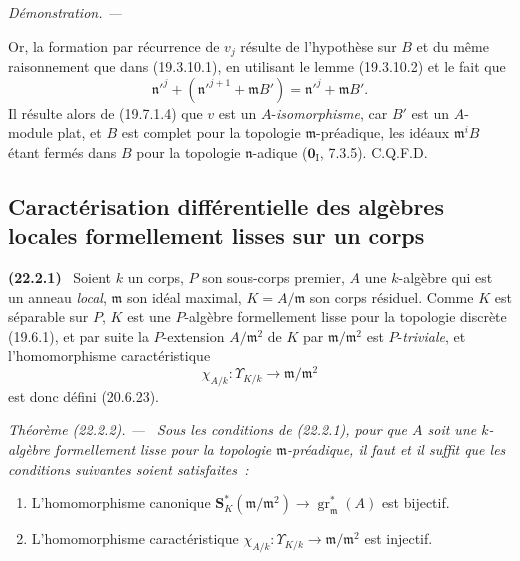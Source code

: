 \documentclass[10pt,oneside]{book}
\makeatletter
\newcommand{\setmanualcurrentlabel}[1]{\def\@currentlabel{#1}}
\newcommand{\oldpage}[2][]{%
  \setcounter{footnote}{0}%
  \marginpar{\scriptsize\textbf{#1}~|~#2}\ignorespaces}
\newenvironment{env}[1][]{\setmanualcurrentlabel{#1}\par\medskip\noindent\textbf{(#1)}\ }{\par}
\newenvironment{theorem}[1][]{%
  \setmanualcurrentlabel{#1}\par\medskip\noindent\itshape Théorème (#1). ---\ }{\par}
\newenvironment{proof}{%
  \par\medskip\noindent\textit{Démonstration. ---\ }}{\par}
\makeatother
\begin{document}
\begin{proof}
\oldpage[0\textsubscript{IV-1}]{186}

Or, la formation par récurrence de $v_j$ résulte de l'hypothèse sur $B$ et
du même raisonnement que dans (19.3.10.1), en utilisant le lemme
(19.3.10.2) et le fait que
\[
  \mathfrak n'^j+(\mathfrak n'^{j+1}+\mathfrak mB')
  =\mathfrak n'^j+\mathfrak mB'.
\]
Il résulte alors de (19.7.1.4) que $v$ est un $A$-\emph{isomorphisme}, car
$B'$ est un $A$-module plat, et $B$ est complet pour la topologie
$\mathfrak m$-préadique, les idéaux $\mathfrak m^iB$ étant fermés dans $B$
pour la topologie $\mathfrak n$-adique ($\mathbf 0_{\mathrm I}$, 7.3.5).
C.Q.F.D.
\end{proof}

\subsection{Caractérisation différentielle des algèbres locales formellement
lisses sur un corps}
\label{subsection:0.22.2-fr}

\begin{env}[22.2.1]
\label{0.22.2.1-fr}
Soient $k$ un corps, $P$ son sous-corps premier, $A$ une $k$-algèbre qui est
un anneau \emph{local}, $\mathfrak m$ son idéal maximal, $K=A/\mathfrak m$
son corps résiduel. Comme $K$ est séparable sur $P$, $K$ est une
$P$-algèbre formellement lisse pour la topologie discrète (19.6.1), et par
suite la $P$-extension $A/\mathfrak m^2$ de $K$ par
$\mathfrak m/\mathfrak m^2$ est $P$-\emph{triviale}, et l'homomorphisme
caractéristique
\begin{equation}
\tag{22.2.1.1}
\label{0.22.2.1.1-fr}
  \chi_{A/k}:\Upsilon_{K/k}\longrightarrow\mathfrak m/\mathfrak m^2
\end{equation}
est donc défini (20.6.23).
\end{env}

\begin{theorem}[22.2.2]
\label{0.22.2.2-fr}
Sous les conditions de (22.2.1), pour que $A$ soit une $k$-algèbre
formellement lisse pour la topologie $\mathfrak m$-préadique, il faut et il
suffit que les conditions suivantes soient satisfaites~:
\begin{enumerate}
  \item[(i)] L'homomorphisme canonique
  $\mathbf S_K^*(\mathfrak m/\mathfrak m^2)\to
  \operatorname{gr}_{\mathfrak m}^*(A)$ est bijectif.
  \item[(ii)] L'homomorphisme caractéristique
  $\chi_{A/k}:\Upsilon_{K/k}\to\mathfrak m/\mathfrak m^2$ est injectif.
\end{enumerate}
\end{theorem}
\end{document}
